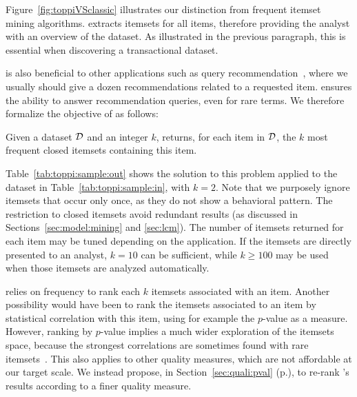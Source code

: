 Figure~\ref{fig:toppiVSclassic} illustrates our distinction from frequent itemset mining algorithms.
\toppi extracts itemsets for all items,
therefore providing the analyst with an overview of the dataset.
As illustrated in the previous paragraph,
this is essential when discovering a transactional dataset.

\toppi is also beneficial to other applications such as query recommendation~\cite{LiRecSys08},
where we usually should give a dozen recommendations related to a requested item.
\toppi ensures the ability to answer recommendation queries, even for rare terms.
We therefore formalize the objective of \toppi as follows:

\begin{definition} Given a dataset ${\cal D}$ and
an integer $k$, \toppi returns, for each item in ${\cal D}$,
the $k$ most frequent closed itemsets containing this item.
\end{definition}



Table~\ref{tab:toppi:sample:out} shows the solution to this problem applied to the dataset in
Table~\ref{tab:toppi:sample:in}, with $k=2$.
Note that we purposely ignore itemsets that occur only once,
as they do not show a behavioral pattern.
The restriction to closed itemsets avoid redundant results
(as discussed in Sections~\ref{sec:model:mining} and \ref{sec:lcm}).
The number of itemsets returned for each item
may be tuned depending on the application.
If the itemsets are directly presented to an analyst,
$k=10$ can be sufficient, while $k\geq\num{100}$ may be used when those itemsets are analyzed automatically.

\toppi relies on frequency to rank each $k$ itemsets associated with an item.
Another possibility would have been to rank the itemsets associated to an item
by statistical correlation with this item, using for example the $p$-value as a measure.
However, ranking by $p$-value implies a much wider exploration of the itemsets space,
because the strongest correlations are sometimes found with rare itemsets~\cite{MinatoKDD14}.
This also applies to other quality measures, which are not affordable at our target scale.
We instead propose, in Section~\ref{sec:quali:pval} (p.\pageref{sec:quali:pval}),
to re-rank \toppi's results according to a finer quality measure.





